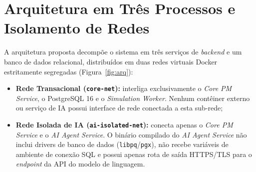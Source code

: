 \documentclass[12pt,openany,oneside,a4paper,english,brazilian,sumario=tradicional]{abntex2}
\begin{document}
\section{Arquitetura em Três Processos e Isolamento de Redes}\label{sec:arq_redes}

A arquitetura proposta decompõe o sistema em três serviços de \textit{backend} e um banco de dados relacional, distribuídos em duas redes virtuais Docker estritamente segregadas (Figura~\ref{fig:arq}):

\begin{itemize}
  \item \textbf{Rede Transacional (\texttt{core-net}):} interliga exclusivamente o \textit{Core PM Service}, o PostgreSQL 16 e o \textit{Simulation Worker}. Nenhum contêiner externo ou serviço de IA possui interface de rede conectada a esta sub-rede;
  \item \textbf{Rede Isolada de IA (\texttt{ai-isolated-net}):} conecta apenas o \textit{Core PM Service} e o \textit{AI Agent Service}. O binário compilado do \textit{AI Agent Service} não inclui drivers de banco de dados (\texttt{libpq}/\texttt{pgx}), não recebe variáveis de ambiente de conexão SQL e possui apenas rota de saída HTTPS/TLS para o \textit{endpoint} da API do modelo de linguagem.
\end{itemize}
\end{document}
